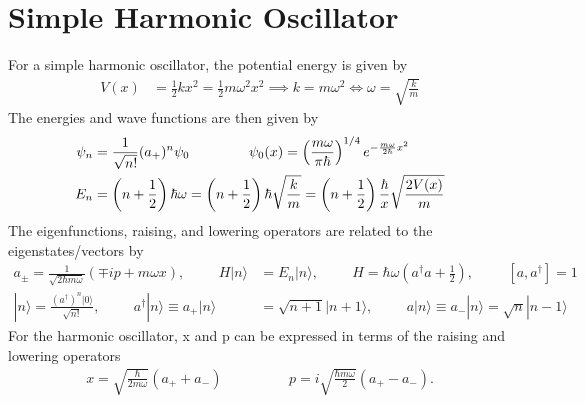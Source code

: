 \section{Simple Harmonic Oscillator}
For a simple harmonic oscillator, the potential energy is given by
\begin{align}
	V(x)&=\frac{1}{2}kx^2=\frac{1}{2}m\omega^2x^2\implies k=m\omega^2 \Longleftrightarrow \omega=\sqrt{\frac{k}{m}} 
\end{align}
The energies and wave functions are then given by
\begin{align}
	\psi_n & = \frac{1}{\sqrt{n!}}(a_+)^n\psi_0 \hspace{1.5cm} \psi_0(x) = \left(\frac{m\omega}{\pi \hbar}\right)^{1/4}e^{-\frac{m\omega}{2\hbar}x^2}  \\ E_n&=\left(n+\frac{1}{2}\right)\hbar\omega=\left(n+\frac{1}{2}\right)\hbar\sqrt{\frac{k}{m}}=\left(n+\frac{1}{2}\right)\frac{\hbar}{x}\sqrt{\frac{2V(x)}{m}}
\end{align}
The eigenfunctions, raising, and lowering operators are related to the eigenstates/vectors by
\begin{align}
	a_\pm = \frac{1}{ \sqrt{2\hbar m\omega} }(\mp i p + m\omega x), \hspace{1cm}
	H | n \rangle &= E_n |n \rangle, \hspace{1cm} H = \hbar \omega \left(a^\dagger a + \frac{1}{2}\right), \hspace{1cm}[a,a^\dagger]=1 \\	
	|n\rangle = \frac{(a^\dagger)^n|0\rangle}{\sqrt{n!}}, \hspace{1cm} a^\dagger|n\rangle \equiv a_+|n \rangle &= \sqrt{n+1}|n+1\rangle, \hspace{1cm} a|n \rangle \equiv a_-|n \rangle = \sqrt{n}|n-1\rangle
\end{align}
For the harmonic oscillator, x and p can be expressed in terms of the raising and lowering operators
\begin{align}
	x = \sqrt{\frac{\hbar}{2m\omega}}(a_++a_-) \hspace{2cm} p =i\sqrt{\frac{\hbar m \omega}{2}}(a_+-a_-).
\end{align}
